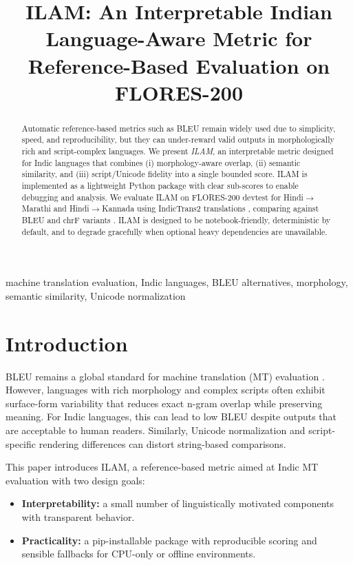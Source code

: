 \documentclass[conference]{IEEEtran}
\title{ILAM: An Interpretable Indian Language-Aware Metric for Reference-Based Evaluation on FLORES-200}
\author{
  \IEEEauthorblockN{Your Name(s)}
  \IEEEauthorblockA{Your Affiliation\\
  Email: your.email@domain}
}
\begin{document}
\maketitle

\begin{abstract}
Automatic reference-based metrics such as BLEU \cite{papineni2002bleu} remain widely used due to simplicity, speed, and reproducibility, but they can under-reward valid outputs in morphologically rich and script-complex languages. We present \emph{ILAM}, an interpretable metric designed for Indic languages that combines (i) morphology-aware overlap, (ii) semantic similarity, and (iii) script/Unicode fidelity into a single bounded score. ILAM is implemented as a lightweight Python package with clear sub-scores to enable debugging and analysis. We evaluate ILAM on FLORES-200 devtest \cite{flores200} for Hindi$\rightarrow$Marathi and Hindi$\rightarrow$Kannada using IndicTrans2 translations \cite{indictrans2}, comparing against BLEU and chrF variants \cite{popovic2015chrf}. ILAM is designed to be notebook-friendly, deterministic by default, and to degrade gracefully when optional heavy dependencies are unavailable.
\end{abstract}

\begin{IEEEkeywords}
machine translation evaluation, Indic languages, BLEU alternatives, morphology, semantic similarity, Unicode normalization
\end{IEEEkeywords}

\section{Introduction}
BLEU remains a global standard for machine translation (MT) evaluation \cite{papineni2002bleu}. However, languages with rich morphology and complex scripts often exhibit surface-form variability that reduces exact n-gram overlap while preserving meaning. For Indic languages, this can lead to low BLEU despite outputs that are acceptable to human readers. Similarly, Unicode normalization and script-specific rendering differences can distort string-based comparisons.

This paper introduces ILAM, a reference-based metric aimed at Indic MT evaluation with two design goals:
\begin{itemize}
  \item \textbf{Interpretability:} a small number of linguistically motivated components with transparent behavior.
  \item \textbf{Practicality:} a pip-installable package with reproducible scoring and sensible fallbacks for CPU-only or offline environments.
\end{itemize}
\end{document}
